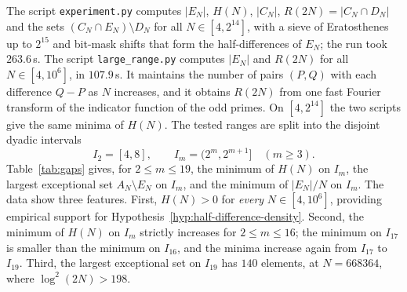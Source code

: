 \documentclass[11pt]{amsart}
\theoremstyle{definition}
\theoremstyle{remark}
\begin{document}
The script \texttt{experiment.py} computes $|E_N|$, $H(N)$, $|C_N|$, $R(2N)=|C_N\cap D_N|$ and the sets $(C_N\cap E_N)\setminus D_N$ for all $N \in [4, 2^{14}]$, with a sieve of Eratosthenes up to $2^{15}$ and bit-mask shifts that form the half-differences of $E_N$; the run took $263.6$\,s. The script \texttt{large\_range.py} computes $|E_N|$ and $R(2N)$ for all $N\in[4,10^6]$, in $107.9$\,s. It maintains the number of pairs $(P,Q)$ with each difference $Q-P$ as $N$ increases, and it obtains $R(2N)$ from one fast Fourier transform of the indicator function of the odd primes. On $[4,2^{14}]$ the two scripts give the same minima of $H(N)$. The tested ranges are split into the disjoint dyadic intervals
\[
I_2=[4,8],\qquad I_m=(2^m,2^{m+1}]\quad(m\geq 3).
\]
Table~\ref{tab:gaps} gives, for $2\leq m\leq 19$, the minimum of $H(N)$ on $I_m$, the largest exceptional set $A_N\setminus E_N$ on $I_m$, and the minimum of $|E_N|/N$ on $I_m$.
The data show three features. First, $H(N) > 0$ for \emph{every} $N \in [4, 10^6]$, providing empirical support for Hypothesis~\ref{hyp:half-difference-density}. Second, the minimum of $H(N)$ on $I_m$ strictly increases for $2\leq m\leq 16$; the minimum on $I_{17}$ is smaller than the minimum on $I_{16}$, and the minima increase again from $I_{17}$ to $I_{19}$. Third, the largest exceptional set on $I_{19}$ has $140$ elements, at $N=668364$, where $\log^2(2N)>198$.
\end{document}

